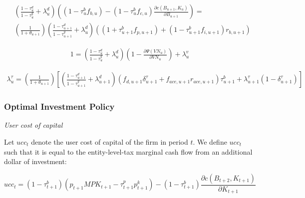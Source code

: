  \begin{equation}
\label{eqn:foc_b_tax}
\begin{split}
&  \left(\frac{1-\tau^{d}_{u}}{1-\tau^{g}_{u}} + \lambda^{d}_{u} \right)\left((1-\tau^{b}_{u}f_{b,u})-(1-\tau^{b}_{u}f_{c,u})\frac{\partial c(B_{u+1},K_{u})}{\partial B_{u+1}}\right)= \\
&  \left(\frac{1}{1+\theta_{u+1}}\right) \left(\frac{1-\tau^{d}_{u+1}}{1-\tau^{g}_{u+1}} + \lambda^{d}_{u} \right) \left((1+\tau^{b}_{u+1}f_{p,u+1})+(1-\tau^{b}_{u+1}f_{i,u+1})r_{b,u+1}\right)
 \end{split}
\end{equation}

 \begin{equation}
\label{eqn:foc_vn_tax}
\begin{split}
1 = \left(\frac{1-\tau^{d}_{u}}{1-\tau^{g}_{u}} + \lambda^{d}_{u}\right)\left(1-\frac{\partial \Psi(VN_{u})}{\partial VN_{u}}\right) + \lambda^{v}_{u}
 \end{split}
\end{equation}

 \begin{equation}
\label{eqn:foc_ktau_tax}
\begin{split}
 \lambda^{\tau}_{u} = \left(\frac{1}{1+\theta_{u+1}}\right)\left[\left(\frac{1-\tau^{d}_{u+1}}{1-\tau^{g}_{u+1}} + \lambda^{d}_{u+1} \right)\left(f_{d,u+1}\delta^{\tau}_{u+1}+f_{ace,u+1}r_{ace,u+1}\right)\tau^{b}_{u+1} + \lambda^{\tau}_{u+1}(1-\delta^{\tau}_{u+1})\right] 
 \end{split}
\end{equation}



\subsubsection{Optimal Investment Policy}


\noindent\noindent \emph{User cost of capital}

Let $ucc_{t}$ denote the user cost of capital of the firm in period $t$.  We define $ucc_{t}$ such that it is equal to the entity-level-tax marginal cash flow from an additional dollar of investment:

\begin{equation}
ucc_{t} = (1-\tau^{b}_{t+1})\left(p_{t+1}MPK_{t+1}-\tau^{p}_{t+1}p^{k}_{t+1}\right)- (1-\tau^{b}_{t+1}) \frac{\partial c(B_{t+2},K_{t+1})}{\partial K_{t+1}}
\end{equation}


